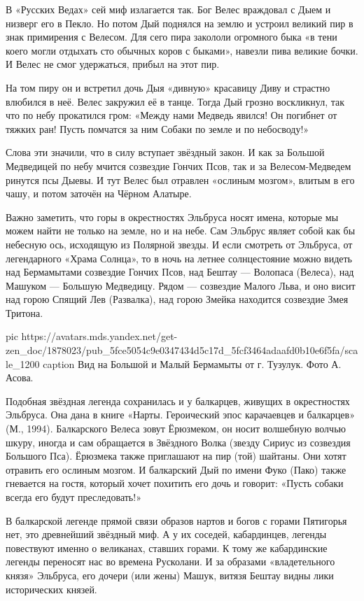 В «Русских Ведах» сей миф излагается так. Бог Велес враждовал с Дыем и низверг
его в Пекло. Но потом Дый поднялся на землю и устроил великий пир в знак
примирения с Велесом. Для сего пира закололи огромного быка «в тени коего могли
отдыхать сто обычных коров с быками», навезли пива великие бочки. И Велес не
смог удержаться, прибыл на этот пир.

На том пиру он и встретил дочь Дыя «дивную» красавицу Диву и страстно влюбился
в неё. Велес закружил её в танце. Тогда Дый грозно воскликнул, так что по небу
прокатился гром: «Между нами Медведь явился! Он погибнет от тяжких ран! Пусть
помчатся за ним Собаки по земле и по небосводу!»

Слова эти значили, что в силу вступает звёздный закон. И как за Большой
Медведицей по небу мчится созвездие Гончих Псов, так и за Велесом-Медведем
ринутся псы Дыевы. И тут Велес был отравлен «ослиным мозгом», влитым в его
чашу, и потом заточён на Чёрном Алатыре.

Важно заметить, что горы в окрестностях Эльбруса носят имена, которые мы можем
найти не только на земле, но и на небе. Сам Эльбрус являет собой как бы
небесную ось, исходящую из Полярной звезды. И если смотреть от Эльбруса, от
легендарного «Храма Солнца», то в ночь на летнее солнцестояние можно видеть над
Бермамытами созвездие Гончих Псов, над Бештау — Волопаса (Велеса), над Машуком
— Большую Медведицу. Рядом — созвездие Малого Льва, и оно висит над горою
Спящий Лев (Развалка), над горою Змейка находится созвездие Змея Тритона.

\ifcmt
  pic https://avatars.mds.yandex.net/get-zen_doc/1878023/pub_5fce5054c9e0347434d5c17d_5fcf3464adaafd0b10e6f5fa/scale_1200
	caption Вид на Большой и Малый Бермамыты от г. Тузулук. Фото А. Асова.
\fi

Подобная звёздная легенда сохранилась и у балкарцев, живущих в окрестностях
Эльбруса. Она дана в книге «Нарты. Героический эпос карачаевцев и балкарцев»
(М., 1994). Балкарского Велеса зовут Ёрюзмеком, он носит волшебную волчью
шкуру, иногда и сам обращается в Звёздного Волка (звезду Сириус из созвездия
Большого Пса). Ёрюзмека также приглашают на пир (той) шайтаны. Они хотят
отравить его ослиным мозгом. И балкарский Дый по имени Фуко (Пако) также
гневается на гостя, который хочет похитить его дочь и говорит: «Пусть собаки
всегда его будут преследовать!»

В балкарской легенде прямой связи образов нартов и богов с горами Пятигорья
нет, это древнейший звёздный миф. А у их соседей, кабардинцев, легенды
повествуют именно о великанах, ставших горами. К тому же кабардинские легенды
переносят нас во времена Русколани. И за образами «владетельного князя»
Эльбруса, его дочери (или жены) Машук, витязя Бештау видны лики исторических
князей.


